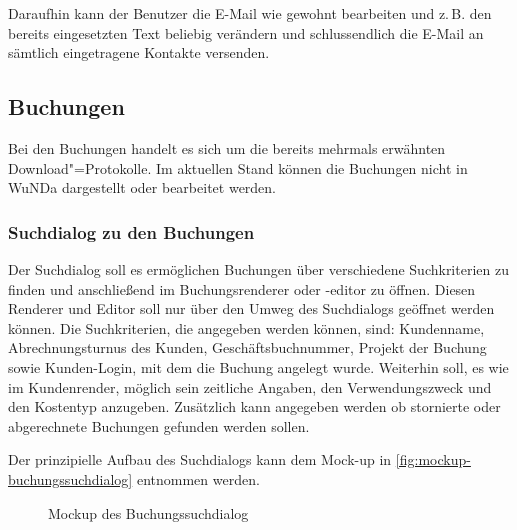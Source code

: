 Daraufhin kann der Benutzer die E-Mail wie gewohnt bearbeiten und z.\,B. den bereits eingesetzten Text beliebig verändern und schlussendlich die E-Mail an sämtlich eingetragene Kontakte versenden.


\subsection{Buchungen} \label{subsec:buchungen}
Bei den Buchungen handelt es sich um die bereits mehrmals erwähnten Download"=Protokolle. Im aktuellen Stand können die Buchungen nicht in \ac{WuNDa} dargestellt oder bearbeitet werden.

\subsubsection{Suchdialog zu den Buchungen} 
Der Suchdialog soll es ermöglichen Buchungen über verschiedene Suchkriterien zu finden und anschließend im Buchungsrenderer oder -editor zu öffnen.
Diesen Renderer und Editor soll nur über den Umweg des Suchdialogs geöffnet werden können. 
Die Suchkriterien, die angegeben werden können, sind: Kundenname, Abrechnungsturnus des Kunden, Geschäftsbuchnummer, Projekt der Buchung sowie Kunden-Login, mit dem die Buchung angelegt wurde.
Weiterhin soll, es wie im Kundenrender, möglich sein zeitliche Angaben, den Verwendungszweck und den Kostentyp anzugeben. Zusätzlich kann angegeben werden ob stornierte oder abgerechnete Buchungen gefunden werden sollen.

Der prinzipielle Aufbau des Suchdialogs kann dem Mock-up in \autoref{fig:mockup-buchungssuchdialog} entnommen werden.
\begin{figure}[htbp]
	\centering
	\caption{Mockup des Buchungssuchdialog}
	\label{fig:mockup-buchungssuchdialog}
\end{figure}

